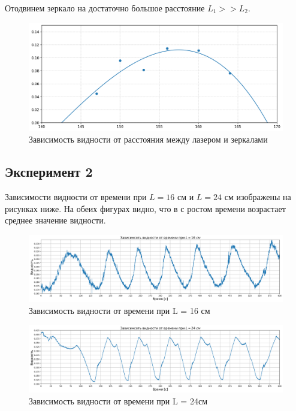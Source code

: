 \documentclass{article}
\begin{document}
Отодвинем зеркало на достаточно большое расстояние $L_{1} >> L_{2}$.
\begin{figure}[htbp]
	\centering
	\includegraphics[width = 0.7 \textwidth]{data_2.png}
	\caption{Зависимость видности от расстояния между лазером и зеркалами}
	\label{pic:exp_2}
\end{figure}


\subsection{Эксперимент 2}

Зависимости видности от времени при $L = 16 \text{ см}$ и $L = 24 \text{ см}$ изображены
на рисунках ниже. На обеих фигурах видно, что в с ростом времени возрастает
среднее значение видности.
\begin{figure}[htbp]
	\centering
	\includegraphics[width = 1\textwidth]{L_16cm.png}
	\caption{Зависимость видности от времени при L = 16 см}
	\label{pic:L_16}
\end{figure}

\begin{figure}[htbp]
	\centering
	\includegraphics[width = 1 \textwidth]{L_24cm.png}
	\caption{Зависимость видности от времени при L = 24см}
	\label{pic:L_24}
\end{figure}


\newpage
\end{document}
